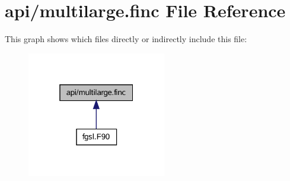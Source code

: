 \hypertarget{multilarge_8finc}{}\section{api/multilarge.finc File Reference}
\label{multilarge_8finc}
This graph shows which files directly or indirectly include this file\+:\nopagebreak
\begin{figure}[H]
\begin{center}
\leavevmode
\includegraphics[width=172pt]{multilarge_8finc__dep__incl}
\end{center}
\end{figure}

